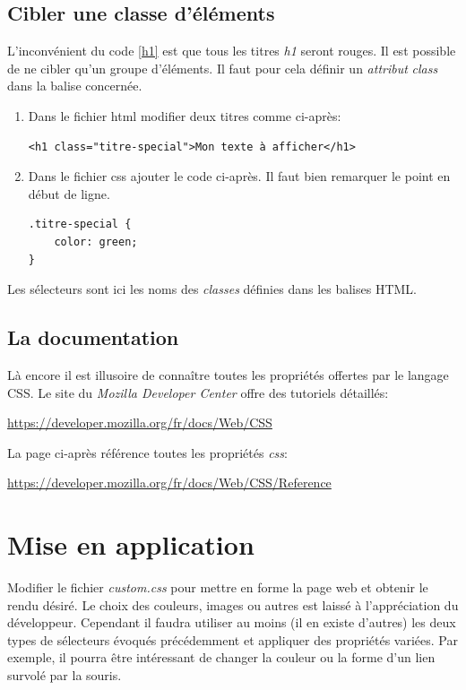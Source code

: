 \documentclass[a4paper,11pt]{article}
\begin{document}
\begin{Form}
\subsection{Cibler une classe d'éléments}
L'inconvénient du code \ref{h1} est que tous les titres \emph{h1} seront rouges. Il est possible de ne cibler qu'un groupe d'éléments. Il faut pour cela définir un \emph{attribut} \emph{class} dans la balise concernée.
\begin{activite}
\begin{enumerate}
\item Dans le fichier html modifier deux titres comme ci-après:
\begin{lstlisting}
<h1 class="titre-special">Mon texte à afficher</h1>
\end{lstlisting}
\medskip
\item Dans le fichier css ajouter le code ci-après. Il faut bien remarquer le point en début de ligne.
\begin{lstlisting}
.titre-special {
	color: green;
}
\end{lstlisting}
\medskip
\end{enumerate}
\end{activite}
Les sélecteurs sont ici les noms des \emph{classes} définies dans les balises HTML.
\subsection{La documentation}
Là encore il est illusoire de connaître toutes les propriétés offertes par le langage CSS. Le site du \emph{Mozilla Developer Center} offre des tutoriels détaillés:
\begin{center}
\url{https://developer.mozilla.org/fr/docs/Web/CSS}
\end{center}
La page ci-après référence toutes les propriétés \emph{css}:
\begin{center}
\url{https://developer.mozilla.org/fr/docs/Web/CSS/Reference}
\end{center}
\section{Mise en application}
\begin{activite}
Modifier le fichier \emph{custom.css} pour mettre en forme la page web et obtenir le rendu désiré. Le choix des couleurs, images ou autres est laissé à l'appréciation du développeur. Cependant il faudra utiliser au moins (il en existe d'autres) les deux types de sélecteurs évoqués précédemment et appliquer des propriétés variées. Par exemple, il pourra être intéressant de changer la couleur ou la forme d'un lien survolé par la souris.
\end{activite}
\end{Form}
\end{document}
